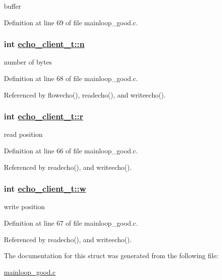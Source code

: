 buffer 



Definition at line 69 of file mainloop\_\-good.c.\hypertarget{structecho__client__t_o2}{
\subsubsection[n]{\setlength{\rightskip}{0pt plus 5cm}int \hyperlink{structecho__client__t_o2}{echo\_\-client\_\-t::n}}}
\label{structecho__client__t_o2}


number of bytes 



Definition at line 68 of file mainloop\_\-good.c.

Referenced by flowecho(), readecho(), and writeecho().\hypertarget{structecho__client__t_o0}{
\subsubsection[r]{\setlength{\rightskip}{0pt plus 5cm}int \hyperlink{structecho__client__t_o0}{echo\_\-client\_\-t::r}}}
\label{structecho__client__t_o0}


read position 



Definition at line 66 of file mainloop\_\-good.c.

Referenced by readecho(), and writeecho().\hypertarget{structecho__client__t_o1}{
\subsubsection[w]{\setlength{\rightskip}{0pt plus 5cm}int \hyperlink{structecho__client__t_o1}{echo\_\-client\_\-t::w}}}
\label{structecho__client__t_o1}


write position 



Definition at line 67 of file mainloop\_\-good.c.

Referenced by readecho(), and writeecho().

The documentation for this struct was generated from the following file:\begin{CompactItemize}
\item 
\hyperlink{mainloop__good_8c}{mainloop\_\-good.c}\end{CompactItemize}
